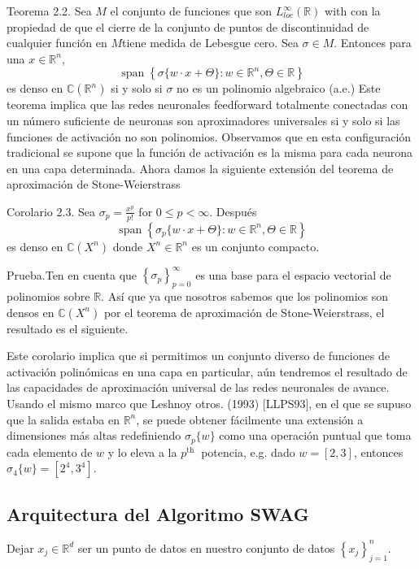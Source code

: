 \documentclass[10pt]{article}
\begin{document}
Teorema 2.2. Sea $M$ el conjunto de funciones que son $L_{l o c}^{\infty}(\mathbb{R})$ with con la propiedad de que el cierre de la conjunto de puntos de discontinuidad de cualquier función en $M$tiene medida de Lebesgue cero. Sea $\sigma \in M$. Entonces para una $x \in \mathbb{R}^{n}$,
$$\operatorname{span}\left\{\sigma\{w \cdot x+\Theta\}: w \in \mathbb{R}^{n}, \Theta \in \mathbb{R}\right\}$$ es denso en $\mathbb{C}\left(\mathbb{R}^{n}\right)$ si y solo si $\sigma$ no es un polinomio algebraico (a.e.)
Este teorema implica que las redes neuronales feedforward totalmente conectadas con un número suficiente de neuronas son aproximadores universales si y solo si las funciones de activación no son polinomios. Observamos que en esta configuración tradicional se supone que la función de activación es la misma para cada neurona en una capa determinada. Ahora damos la siguiente extensión del teorema de aproximación de Stone-Weierstrass

Corolario 2.3. Sea $\sigma_{p}=\frac{x^{p}}{p !}$ for $0 \leq p<\infty$. Después
$$
\operatorname{span}\left\{\sigma_{p}\{w \cdot x+\Theta\}: w \in \mathbb{R}^{n}, \Theta \in \mathbb{R}\right\}
$$es denso en $\mathbb{C}\left(X^{n}\right)$ donde $X^{n} \in \mathbb{R}^{n}$ es un conjunto compacto.

Prueba.Ten en cuenta que $\left\{\sigma_{p}\right\}_{p=0}^{\infty}$ es una base para el espacio vectorial de polinomios sobre $\mathbb{R}$. Así que ya que nosotros sabemos que los polinomios son densos en $\mathbb{C}\left(X^{n}\right)$ por el teorema de aproximación de Stone-Weierstrass, el resultado es el siguiente.

Este corolario implica que si permitimos un conjunto diverso de funciones de activación polinómicas en una capa en particular, aún tendremos el resultado de las capacidades de aproximación universal de las redes neuronales de avance. Usando el mismo marco que Leshnoy otros. (1993) [LLPS93], en el que se supuso que la salida estaba en $\mathbb{R}^{n}$, se puede obtener fácilmente una extensión a dimensiones más altas redefiniendo $\sigma_{p}\{w\}$ como una operación puntual que toma cada elemento de $w$ y lo eleva a la $p^{\text {th }}$ potencia, e.g. dado $w=[2,3]$, entonces $\sigma_{4}\{w\}=\left[2^{4}, 3^{4}\right]$.

\subsection{Arquitectura del Algoritmo SWAG}
Dejar $x_{j} \in \mathbb{R}^{d}$ ser un punto de datos en nuestro conjunto de datos $\left\{x_{j}\right\}_{j=1}^{n}$.
\end{document}
